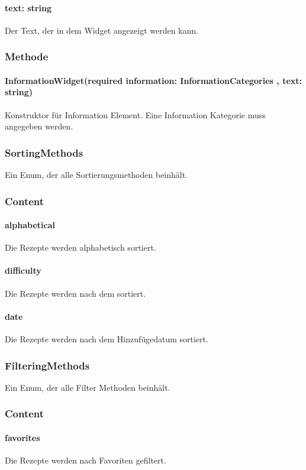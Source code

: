 \documentclass{entwurfsheft}
\begin{document}
\paragraph*{text: string} Der Text, der in dem Widget angezeigt werden kann.

\subsubsection*{Methode}
\paragraph*{InformationWidget(required information: InformationCategories , text: string)} Konstruktor für Information Element. Eine Information Kategorie muss angegeben werden.


\subsubsection{SortingMethods}\label{sec:SortingMethods}
Ein Enum, der alle Sortierungsmethoden beinhält.
\subsubsection*{Content}
\paragraph*{alphabetical} Die Rezepte werden alphabetisch sortiert.
\paragraph*{difficulty} Die Rezepte werden nach dem  sortiert.
\paragraph*{date} Die Rezepte werden nach dem Hinzufügedatum sortiert.

\subsubsection{FilteringMethods}\label{sec:FilteringMethods}
Ein Enum, der alle Filter Methoden beinhält.
\subsubsection*{Content}
\paragraph*{favorites} Die Rezepte werden nach Favoriten gefiltert.
\end{document}
